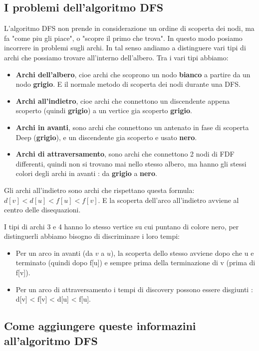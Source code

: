 \subsection{I problemi dell'algoritmo DFS}
L'algoritmo DFS non prende in considerazione un ordine di scoperta dei nodi, ma fa "come piu gli piace", o "scopre il primo che trova". In questo modo posiamo incorrere in problemi sugli archi. In tal senso andiamo a distinguere vari tipi di archi che possiamo trovare all'interno dell'albero.
Tra i vari tipi abbiamo:
\begin{itemize}
	\item \textbf{Archi dell'albero}, cioe archi che scoprono un nodo \textbf{bianco} a partire da un nodo \textbf{grigio}. E il normale metodo di scoperta dei nodi durante una DFS.
	\item \textbf{Archi all'indietro}, cioe archi che connettono un discendente appena scoperto (quindi \textbf{grigio}) a un vertice gia scoperto \textbf{grigio}.
	\item \textbf{Archi in avanti}, sono archi che connettono un antenato in fase di scoperta Deep (\textbf{grigio}), e un discendente gia scoperto e usato \textbf{nero}.
	\item \textbf{Archi di attraversamento}, sono archi che connettono 2 nodi  di FDF differenti, quindi non si trovano mai nello stesso albero, ma hanno gli stessi colori degli archi in avanti : da \textbf{grigio} a \textbf{nero}.
\end{itemize}

Gli archi all'indietro sono archi che rispettano questa formula: $d[v] < d[u] < f[u] < f[v]$. E la scoperta dell'arco all'indietro avviene al centro delle disequazioni.

I tipi di archi 3 e 4 hanno lo stesso vertice su cui puntano di colore nero, per distinguerli abbiamo bisogno di discriminare i loro tempi:
\begin{itemize}
	\item Per un arco in avanti (da $v$ a $u$), la scoperta dello stesso avviene dopo che u e terminato (quindi dopo f[u]) e sempre prima della terminazione di v (prima di f[v]).
	\item Per un arco di attraversamento i tempi di discovery possono essere disgiunti : d[v] < f[v] < d[u] < f[u].
\end{itemize}
	
	
	
\subsection{Come aggiungere queste informazini all'algoritmo DFS}

